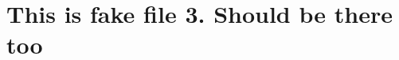 \documentclass{article}
\begin{document}
\section*{This is fake file 3. Should be there too}
\end{document}
